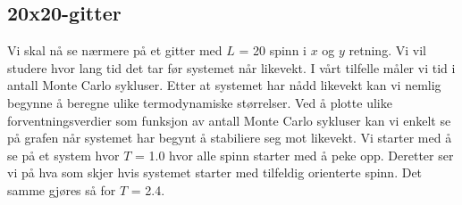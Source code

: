 \documentclass[11pt,a4paper]{article}
\begin{document}
\subsection{20x20-gitter}
Vi skal nå se nærmere på et gitter med $L$ = 20 spinn i $x$ og $y$ retning. Vi vil studere hvor lang tid det tar før systemet når likevekt. I vårt tilfelle måler vi tid i antall Monte Carlo sykluser. Etter at systemet har nådd likevekt kan vi nemlig begynne å beregne ulike termodynamiske størrelser. Ved å plotte ulike forventningsverdier som funksjon av antall Monte Carlo sykluser kan vi enkelt se på grafen når systemet har begynt å stabiliere seg mot likevekt. Vi starter med å se på et system hvor $T$ = 1.0 hvor alle spinn starter med å peke opp. Deretter ser vi på hva som skjer hvis systemet starter med tilfeldig orienterte spinn. Det samme gjøres så for $T$ = 2.4.
\end{document}
